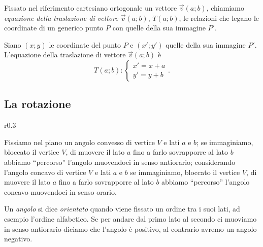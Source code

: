 \begin{definizione}
Fissato nel riferimento cartesiano ortogonale un vettore 
$\vec{v}(a;b)$, chiamiamo \emph{equazione della traslazione di 
vettore $\vec{v}(a;b)$}, $T(a;b)$, le relazioni che legano le 
coordinate di un generico punto $P$ con quelle della sua immagine 
$P'$.
\end{definizione}

Siano $(x;y)$ le coordinate del punto $P$ e $(x';y')$ quelle della 
sua immagine $P'$. L'equazione della traslazione di vettore 
$\vec{v}(a;b)$ è
\[T(a;b):\begin{cases}x'=x+a\\y'=y+b\end{cases}.\]


\subsection{La rotazione}

\setlength{\intextsep}{3pt plus 2.0pt minus 2.0pt}
\begin{wrapfigure}{r}{0.3\textwidth}
	\centering
\end{wrapfigure}
Fissiamo nel piano un angolo convesso di vertice $V$ e lati $a$ e 
$b$; se immaginiamo, bloccato il vertice $V$, di muovere il lato $a$ 
fino a farlo sovrapporre al lato $b$ abbiamo ``percorso'' l'angolo 
muovendoci in senso antiorario; considerando l'angolo concavo di 
vertice $V$ e lati $a$ e $b$ se immaginiamo, bloccato il vertice $V$, 
di muovere il lato $a$ fino a farlo sovrapporre al lato $b$ abbiamo 
``percorso'' l'angolo concavo muovendoci in senso orario.

\begin{definizione}
Un \emph{angolo} si dice \emph{orientato} quando viene fissato un 
ordine tra i suoi lati, ad esempio l'ordine alfabetico. Se per andare 
dal primo lato al secondo ci muoviamo in senso antiorario diciamo che 
l'angolo è positivo, al contrario avremo un angolo negativo.
\end{definizione}

